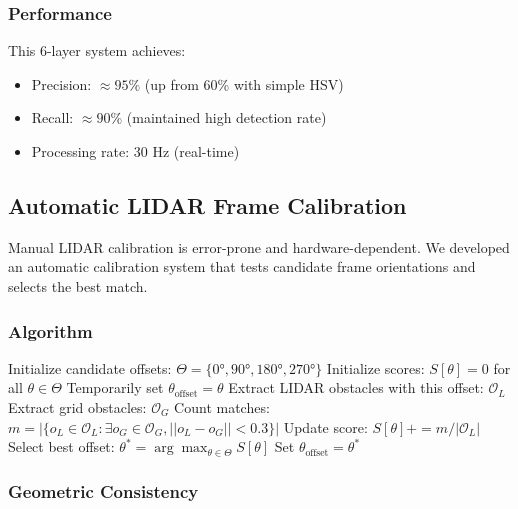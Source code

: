 \documentclass[11pt,a4paper]{article}
\begin{document}
\subsubsection{Performance}

This 6-layer system achieves:
\begin{itemize}
    \item Precision: $\approx 95\%$ (up from 60\% with simple HSV)
    \item Recall: $\approx 90\%$ (maintained high detection rate)
    \item Processing rate: 30 Hz (real-time)
\end{itemize}

\subsection{Automatic LIDAR Frame Calibration}

Manual LIDAR calibration is error-prone and hardware-dependent. We developed an automatic calibration system that tests candidate frame orientations and selects the best match.

\subsubsection{Algorithm}

\begin{algorithm}[H]
\caption{Automatic LIDAR Frame Calibration}
\begin{algorithmic}[1]
\STATE Initialize candidate offsets: $\Theta = \{0°, 90°, 180°, 270°\}$
\STATE Initialize scores: $S[\theta] = 0$ for all $\theta \in \Theta$
    \FOR{$\theta \in \Theta$}
        \STATE Temporarily set $\theta_{\text{offset}} = \theta$
        \STATE Extract LIDAR obstacles with this offset: $\mathcal{O}_L$
        \STATE Extract grid obstacles: $\mathcal{O}_G$
        \STATE Count matches: $m = |\{o_L \in \mathcal{O}_L : \exists o_G \in \mathcal{O}_G, ||o_L - o_G|| < 0.3\}|$
        \STATE Update score: $S[\theta] += m / |\mathcal{O}_L|$
    \ENDFOR
\ENDFOR
\STATE Select best offset: $\theta^* = \arg\max_{\theta \in \Theta} S[\theta]$
\STATE Set $\theta_{\text{offset}} = \theta^*$
\end{algorithmic}
\end{algorithm}

\subsubsection{Geometric Consistency}
\end{document}
